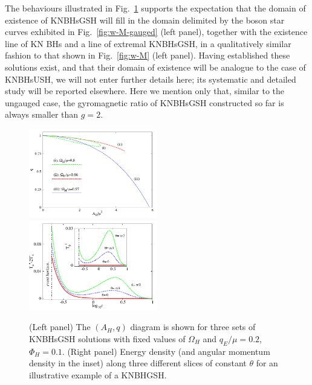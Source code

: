The behaviours illustrated in Fig.~\ref{fig:q-AH-gauged} supports the expectation that the domain of existence of KNBHsGSH will fill in the domain delimited by the boson star curves exhibited in Fig.~\ref{fig:w-M-gauged} (left panel), together with the existence line of KN BHs and a line of extremal KNBHsGSH,  in a qualitatively similar fashion to that shown in Fig.~\ref{fig:w-M} (left panel). Having established these solutions exist, and that their domain of existence will be analogue to the case of KNBHsUSH, we will not enter further details here; its systematic and detailed study will be reported elsewhere.
Here we mention only that, similar to the ungauged case, 
the gyromagnetic ratio of  KNBHsGSH constructed so far is always smaller than $g=2$.


\begin{figure}[H]
  \begin{center}
    \includegraphics[width=0.497\textwidth]{papers/KerrNewman/BH-q-AH} 
      \includegraphics[width=0.497\textwidth]{papers/KerrNewman/energy-2d} 
  \end{center}
  \caption{ (Left panel) 
	The $(A_H,q)$ diagram is shown for three sets of KNBHsGSH solutions with fixed values of 
$\Omega_H$ and 
$q_E/\mu=0.2$, 
$\Phi_H=0.1$. (Right panel) 
 Energy density (and angular momentum density in the inset) along three different slices of constant $\theta$ for an illustrative example of a KNBHGSH.
	}
  \label{fig:q-AH-gauged}
\end{figure}
 


